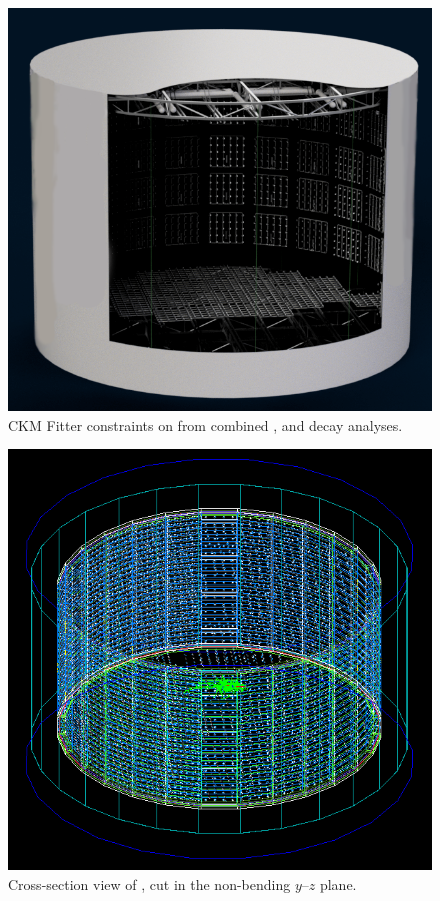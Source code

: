 \begin{figure}
    \includegraphics[width=\largefigwidth]{diagrams/4-chips/chips_render_1}
    \caption[CKM Fitter constraints on \alphaCKM.]%
    {CKM Fitter constraints on \alphaCKM from combined \BToPiPi,
        \BToRhoPi and \BToRhoRho decay analyses.}
    \label{fig:chips_render_1}
\end{figure}

\begin{figure}
    \begin{center}
        \includegraphics[width=0.8\textheight]{diagrams/4-chips/chips_event}
        \caption[Cross-section view of \LHCb, cut in the non-bending $y$--$z$ plane]%
        {Cross-section view of \LHCb, cut in the non-bending $y$--$z$ plane.}
        \label{fig:chips_event}
    \end{center}
\end{figure}


